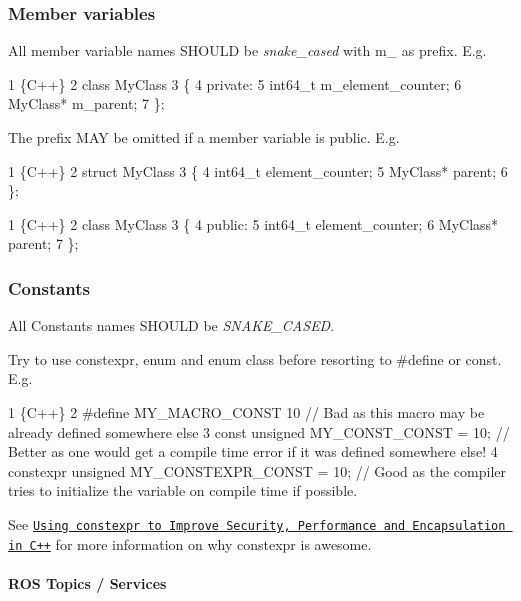 \subsubsection*{Member variables}

All member variable names S\+H\+O\+U\+LD be {\itshape snake\+\_\+cased} with {\ttfamily m\+\_\+} as prefix. E.\+g. 
\begin{DoxyCode}
1 \{C++\}
2 class MyClass
3 \{
4     private:
5     int64\_t m\_element\_counter;
6     MyClass* m\_parent;
7 \};
\end{DoxyCode}


The prefix M\+AY be omitted if a member variable is {\ttfamily public}. E.\+g. 
\begin{DoxyCode}
1 \{C++\}
2 struct MyClass
3 \{
4     int64\_t element\_counter;
5     MyClass* parent;
6 \};
\end{DoxyCode}
 
\begin{DoxyCode}
1 \{C++\}
2 class MyClass
3 \{
4     public:
5     int64\_t element\_counter;
6     MyClass* parent;
7 \};
\end{DoxyCode}


\subsubsection*{Constants}

All Constants names S\+H\+O\+U\+LD be {\itshape S\+N\+A\+K\+E\+\_\+\+C\+A\+S\+ED}.

Try to use {\ttfamily constexpr}, {\ttfamily enum} and {\ttfamily enum class} before resorting to {\ttfamily \#define} or {\ttfamily const}. E.\+g. 
\begin{DoxyCode}
1 \{C++\}
2 #define MY\_MACRO\_CONST 10                   // Bad as this macro may be already defined somewhere else
3 const unsigned MY\_CONST\_CONST = 10;         // Better as one would get a compile time error if it was
       defined somewhere else!
4 constexpr unsigned MY\_CONSTEXPR\_CONST = 10; // Good as the compiler tries to initialize the variable on
       compile time if possible.
\end{DoxyCode}


See \href{https://smartbear.de/blog/develop/using-constexpr-to-improve-security-performance-an/?l=ua}{\tt Using constexpr to Improve Security, Performance and Encapsulation in C++} for more information on why {\ttfamily constexpr} is awesome.

\paragraph*{R\+OS Topics / Services}

